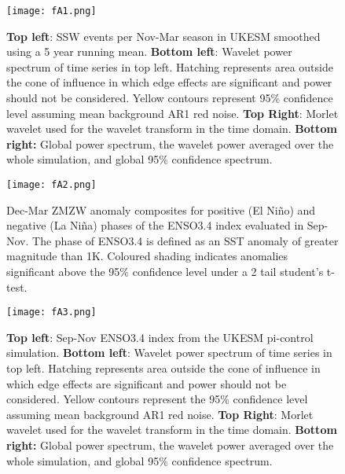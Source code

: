 \documentclass[wcd, manuscript]{copernicus}
\begin{document}
\begin{center}
\begin{figure}[h!]
\noindent\texttt{[image: fA1.png]}
\caption{\textbf{Top left}: SSW events per Nov-Mar season in UKESM smoothed using a 5 year running mean. \textbf{Bottom left}: Wavelet power spectrum of time series in top left. Hatching represents area outside the cone of influence in which edge effects are significant and power should not be considered. Yellow contours represent 95\% confidence level assuming mean background AR1 red noise. \textbf{Top Right}: Morlet wavelet used for the wavelet transform in the time domain. \textbf{Bottom right:} Global power spectrum, the wavelet power averaged over the whole simulation, and global 95\% confidence spectrum.}
\label{fig3}
\end{figure}
\end{center}

\begin{center}
\begin{figure}[h!]
\noindent\texttt{[image: fA2.png]}
\caption{Dec-Mar ZMZW anomaly composites for positive (El Ni\~{n}o) and negative (La Ni\~{n}a) phases of the ENSO3.4 index evaluated in Sep-Nov. The phase of ENSO3.4 is defined as an SST anomaly of greater magnitude than 1K. Coloured shading indicates anomalies significant above the 95\% confidence level under a 2 tail student’s t-test.}
\label{fig3}
\end{figure}
\end{center}


\begin{center}
\begin{figure}[h!]
\noindent\texttt{[image: fA3.png]}
\caption{\textbf{Top left}: Sep-Nov ENSO3.4 index from the UKESM pi-control simulation. \textbf{Bottom left}: Wavelet power spectrum of time series in top left. Hatching represents area outside the cone of influence in which edge effects are significant and power should not be considered. Yellow contours represent the 95\% confidence level assuming mean background AR1 red noise. \textbf{Top Right}: Morlet wavelet used for the wavelet transform in the time domain. \textbf{Bottom right:} Global power spectrum, the wavelet power averaged over the whole simulation, and global 95\% confidence spectrum.}
\label{fig3}
\end{figure}
\end{center}
\end{document}
